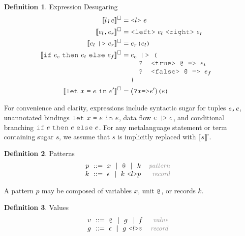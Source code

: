 \documentclass[acmsmall]{acmart}
\theoremstyle{definition}
\newtheorem{definition}{Definition}[section]
\begin{document}
\begin{definition} 
  \label{def:expression_desugaring}
  Expression Desugaring
  \hfill 
  \small
  \\
  \begin{align*}
      \llbracket l \J{;} e \rrbracket^\square &= \J{<}l \J{>}\ e
      \\
      \llbracket e_l \J{,} e_r \rrbracket^\square &= \J{<left>}\ e_l \ \J{<right>}\ e_r
      \\
      \llbracket e_l\ \J{|>}\ e_r \rrbracket^\square &= e_r\J{(}e_l\J{)}
      \\
      \llbracket \J{if}\ e_c\ \J{then}\ e_t\ \J{else}\ e_f \rrbracket^\square &= 
      \begin{array}[t]{@{} l}
        e_c \J{ |> (}
          \\
          \I \J{? <true> @ => } e_t
          \\
          \I \J{? <false> @ => } e_f
          \\
        \J{)}
      \end{array}
      \\
      \llbracket \J{let}\ x\ \J{=}\ e\ \J{in}\ e' \rrbracket^\square &= (\J{?}x \J{=>} e')\J{(}e\J{)}
  \end{align*}

\end{definition} 

\noindent
For convenience and clarity, expressions include syntactic sugar for tuples $e\J{,}e$, 
unannotated bindings $\J{let}\ x\ \J{=}\ e\ \J{in}\ e$, data flow $e\ \J{|>}\ e$,
and conditional branching $\J{if}\ e\ \J{then}\ e\ \J{else}\ e$.
For any metalanguage statement or term containing sugar $s$, we assume that $s$ is implicitly replaced with $\llbracket s \rrbracket^\square$.

\begin{definition} Patterns 
  \label{def:patterns}
  \[\begin{array}[t]{r@{}l@{}r}
    \nonterm{p} & \is 
      x \sep
      \J{@} \sep
      k
    & \com{pattern}
    \\
    \nonterm{k} & \is \epsilon \sep k\ \J{<}l\J{>}p
    & \com{record}
  \end{array}\]
\end{definition}

\noindent
A pattern $p$ may be composed of variables $x$, unit $\J{@}$, or records $k$. 

\begin{definition} Values 
  \label{def:values}
  \[\begin{array}[t]{r@{}l@{}r}
    \nonterm{v} & \is 
      \J{@} \sep
      g \sep
      f
    & \com{value}
    \\
    \nonterm{g} & \is \epsilon \sep g\ \J{<}l\J{>}v
    & \com{record}
  \end{array}\]
\end{definition}
\end{document}
